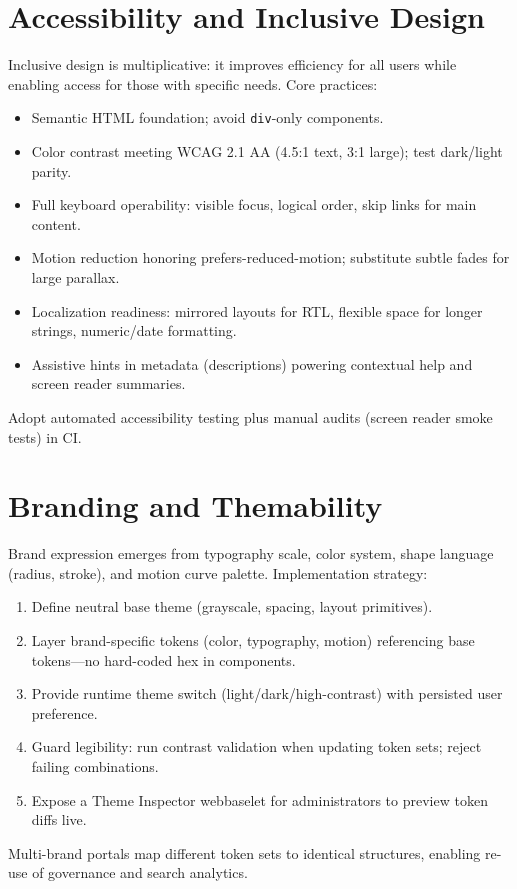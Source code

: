 \section{Accessibility and Inclusive Design}
Inclusive design is multiplicative: it improves efficiency for all users while enabling access for those with specific needs. Core practices:
\begin{itemize}
	\item Semantic HTML foundation; avoid \texttt{div}-only components.
	\item Color contrast meeting WCAG 2.1 AA (4.5:1 text, 3:1 large); test dark/light parity.
	\item Full keyboard operability: visible focus, logical order, skip links for main content.
	\item Motion reduction honoring prefers-reduced-motion; substitute subtle fades for large parallax.
	\item Localization readiness: mirrored layouts for RTL, flexible space for longer strings, numeric/date formatting.
	\item Assistive hints in metadata (descriptions) powering contextual help and screen reader summaries.
\end{itemize}
Adopt automated accessibility testing plus manual audits (screen reader smoke tests) in CI.

\section{Branding and Themability}
Brand expression emerges from typography scale, color system, shape language (radius, stroke), and motion curve palette. Implementation strategy:
\begin{enumerate}
	\item Define neutral base theme (grayscale, spacing, layout primitives).
	\item Layer brand-specific tokens (color, typography, motion) referencing base tokens—no hard-coded hex in components.
	\item Provide runtime theme switch (light/dark/high-contrast) with persisted user preference.
	\item Guard legibility: run contrast validation when updating token sets; reject failing combinations.
	\item Expose a Theme Inspector webbaselet for administrators to preview token diffs live.
\end{enumerate}
Multi-brand portals map different token sets to identical \wbol{} structures, enabling re-use of governance and search analytics.

